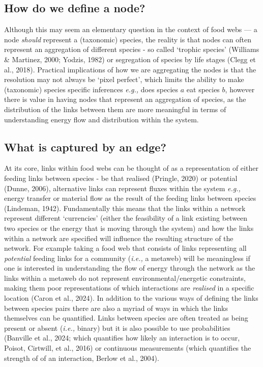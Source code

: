 \documentclass[
]{article}
\begin{document}
\subsection{How do we define a node?}\label{how-do-we-define-a-node}

Although this may seem an elementary question in the context of food
webs --- a node \emph{should} represent a (taxonomic) species, the
reality is that nodes can often represent an aggregation of different
species - so called `trophic species' (Williams \& Martinez, 2000;
Yodzis, 1982) or segregation of species by life stages (Clegg et al.,
2018). Practical implications of how we are aggregating the nodes is
that the resolution may not always be `pixel perfect', which limits the
ability to make (taxonomic) species specific inferences \emph{e.g.,}
does species \(a\) eat species \(b\), however there is value in having
nodes that represent an aggregation of species, as the distribution of
the links between them are more meaningful in terms of understanding
energy flow and distribution within the system.

\subsection{What is captured by an
edge?}\label{what-is-captured-by-an-edge}

At its core, links within food webs can be thought of as a
representation of either feeding links between species - be that
realised (Pringle, 2020) or potential (Dunne, 2006), alternative links
can represent fluxes within the system \emph{e.g.,} energy transfer or
material flow as the result of the feeding links between species
(Lindeman, 1942). Fundamentally this means that the links within a
network represent different `currencies' (either the feasibility of a
link existing between two species or the energy that is moving through
the system) and how the links within a network are specified will
influence the resulting structure of the network. For example taking a
food web that consists of links representing all \emph{potential}
feeding links for a community (\emph{i.e.,} a metaweb) will be
meaningless if one is interested in understanding the flow of energy
through the network as the links within a metaweb do not represent
environmental/energetic constraints, making them poor representations of
which interactions are \emph{realised} in a specific location (Caron et
al., 2024). In addition to the various ways of defining the links
between species pairs there are also a myriad of ways in which the links
themselves can be quantified. Links between species are often treated as
being present or absent (\emph{i.e.,} binary) but it is also possible to
use probabilities (Banville et al., 2024; which quantifies how likely an
interaction is to occur, Poisot, Cirtwill, et al., 2016) or continuous
measurements (which quantifies the strength of of an interaction, Berlow
et al., 2004).
\end{document}
